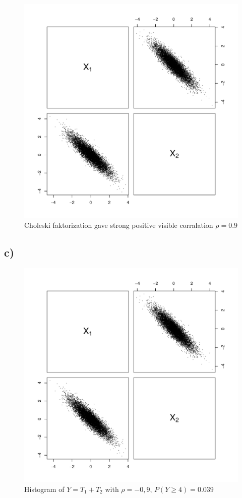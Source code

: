 \documentclass[a4paper, 11pt]{article}
\begin{document}
\begin{figure}[H]
  \centering
  \includegraphics[scale=0.5,page=4]{Rplots4.pdf}
  \caption{Choleski faktorization gave strong positive visible corralation $\rho = 0.9$}
  \label{x1x2pos}
\end{figure}


\subsection*{c)}

\begin{figure}[H]
  \centering
  \includegraphics[scale=0.5,page=7]{Rplots4.pdf}
  \caption{Histogram of $Y=T_1 + T_2$ with $\rho = -0,9$, $P(Y\geq4) = 0.039$}
  \label{ygekroneg}
\end{figure}
\end{document}

